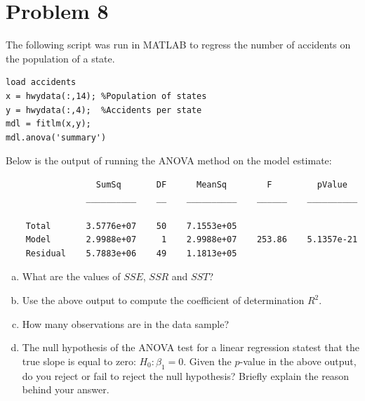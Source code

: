 \documentclass[11pt,twoside]{article}
\newcommand{\pts}[1]{\marginpar{ \small\hspace{0pt} \textit{[#1]} } }
\numberwithin{equation}{section}
\newcommand{\?}{\stackrel{?}{=}}
\begin{document}
\section*{Problem 8      }
The following script was run in MATLAB to regress the number of accidents on the population of a state.
\begin{verbatim}
load accidents
x = hwydata(:,14); %Population of states
y = hwydata(:,4);  %Accidents per state
mdl = fitlm(x,y);
mdl.anova('summary')
\end{verbatim}
Below is the output of running the ANOVA method on the model estimate:
\begin{verbatim}
                  SumSq       DF      MeanSq        F         pValue  
                __________    __    __________    ______    __________

    Total       3.5776e+07    50    7.1553e+05                        
    Model       2.9988e+07     1    2.9988e+07    253.86    5.1357e-21
    Residual    5.7883e+06    49    1.1813e+05                        
\end{verbatim}
\begin{enumerate}[(a)]
\item What are the values of $SSE$, $SSR$ and $SST$? \pts{3}
  \vspace{20ex}
  
\item Use the above output to compute the coefficient of determination $R^2$. \pts{2}
\vspace{20ex}
  
\item How many observations are in the data sample? \pts{1}
\vspace{7ex}
  
\item The null hypothesis of the ANOVA test for a \pts{2} linear regression statest that the true slope is equal to zero: $H_0: \beta_1 = 0$. Given the $p$-value in the above output, do you reject or fail to reject the null hypothesis? Briefly explain the reason behind your answer.

  
\end{enumerate}
\end{document}
